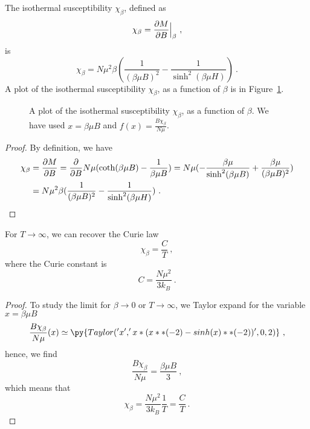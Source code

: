     The isothermal susceptibility $\chi_\beta$, defined as 
    \begin{equation*}
        \chi_\beta = \frac{\partial M}{\partial B} \Big \vert_\beta ~,
    \end{equation*}  
    is 
    \begin{equation*}
        \chi_\beta = N \mu^2 \beta ( \frac{1}{(\beta \mu B)^2} - \frac{1}{\sinh^2 (\beta \mu H)}) ~.
    \end{equation*}
    A plot of the isothermal susceptibility $\chi_\beta$, as a function of $\beta$ is in Figure~\ref{fig:c:sus}.
    \begin{figure}
        \centering
        \caption{A plot of the isothermal susceptibility $\chi_\beta$, as a function of $\beta$. We have used $x = \beta \mu B$ and $f(x) = \frac{B \chi_\beta}{N \mu}$.}
        \label{fig:c:sus}
    \end{figure}
    \begin{proof}
        By definition, we have
        \begin{equation*}
        \begin{aligned}
            \chi_\beta & = \frac{\partial M}{\partial B} = \frac{\partial}{\partial B} N\mu (\coth(\beta \mu B) - \frac{1}{\beta \mu B}) = N \mu ( - \frac{\beta \mu}{\sinh^2 (\beta \mu B)} + \frac{\beta \mu}{(\beta \mu B)^2} ) \\ & = N \mu^2 \beta ( \frac{1}{(\beta \mu B)^2} - \frac{1}{\sinh^2 (\beta \mu H)}) ~.
        \end{aligned}
        \end{equation*}
    \end{proof}
    
    For $T \rightarrow \infty$, we can recover the Curie law 
    \begin{equation*}
        \chi_\beta = \frac{C}{T} ~,
    \end{equation*}
    where the Curie constant is 
    \begin{equation*}
        C = \frac{N \mu^2}{3 k_B} ~.
    \end{equation*}
    \begin{proof}
        To study the limit for $\beta \rightarrow 0$ or $T \rightarrow \infty$, we Taylor expand for the variable $x = \beta \mu B$
        \begin{equation*}
            \frac{B \chi_\beta}{N \mu} (x) \simeq \py{Taylor('x', 'x * ( x**(-2) - sinh(x)**(-2))', 0, 2)} ~,
        \end{equation*}
        hence, we find
        \begin{equation*}
            \frac{B \chi_\beta}{N \mu} = \frac{\beta \mu B}{3} ~,
        \end{equation*}
        which means that
        \begin{equation*}
            \chi_\beta = \frac{N \mu^2}{3 k_B} \frac{1}{T} = \frac{C}{T} ~.
        \end{equation*}
    \end{proof}


